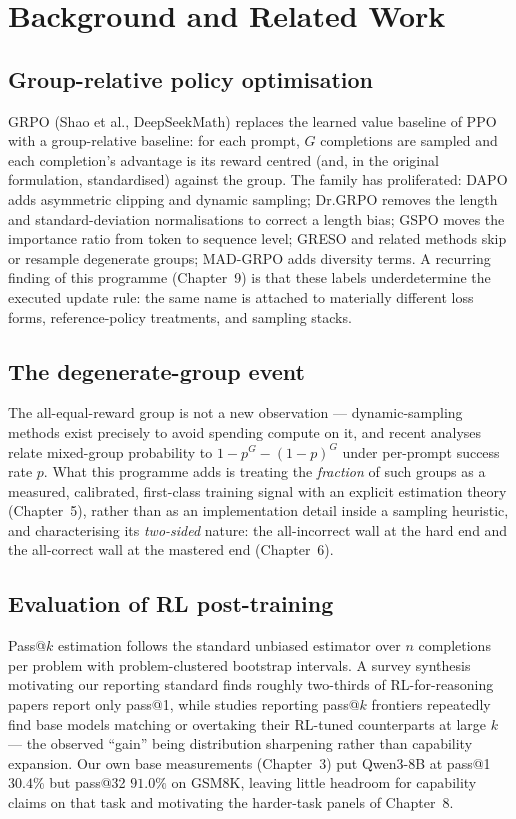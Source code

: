 \chapter{Background and Related Work}
\label{ch:background}

\section{Group-relative policy optimisation}
GRPO (Shao et al., DeepSeekMath) replaces the learned value baseline of PPO
with a group-relative baseline: for each prompt, $G$ completions are sampled
and each completion's advantage is its reward centred (and, in the original
formulation, standardised) against the group. The family has proliferated:
DAPO adds asymmetric clipping and dynamic sampling; Dr.GRPO removes the length
and standard-deviation normalisations to correct a length bias; GSPO moves the
importance ratio from token to sequence level; GRESO and related methods skip
or resample degenerate groups; MAD-GRPO adds diversity terms. A recurring
finding of this programme (Chapter~9) is that these labels underdetermine the
executed update rule: the same name is attached to materially different loss
forms, reference-policy treatments, and sampling stacks.

\section{The degenerate-group event}
The all-equal-reward group is not a new observation --- dynamic-sampling
methods exist precisely to avoid spending compute on it, and recent analyses
relate mixed-group probability to $1-p^G-(1-p)^G$ under per-prompt success
rate $p$. What this programme adds is treating the \emph{fraction} of such
groups as a measured, calibrated, first-class training signal with an explicit
estimation theory (Chapter~5), rather than as an implementation detail inside
a sampling heuristic, and characterising its \emph{two-sided} nature: the
all-incorrect wall at the hard end and the all-correct wall at the mastered
end (Chapter~6).

\section{Evaluation of RL post-training}
Pass@$k$ estimation follows the standard unbiased estimator over $n$
completions per problem with problem-clustered bootstrap intervals. A survey
synthesis motivating our reporting standard finds roughly two-thirds of
RL-for-reasoning papers report only pass@1, while studies reporting pass@$k$
frontiers repeatedly find base models matching or overtaking their RL-tuned
counterparts at large $k$ --- the observed ``gain'' being distribution
sharpening rather than capability expansion. Our own base measurements
(Chapter~3) put Qwen3-8B at pass@1 $30.4\%$ but pass@32 $91.0\%$ on GSM8K,
leaving little headroom for capability claims on that task and motivating the
harder-task panels of Chapter~8.

